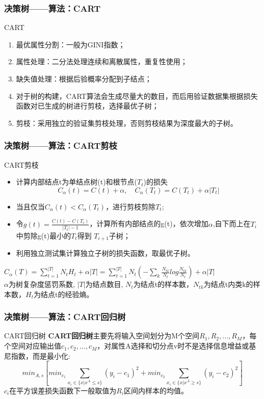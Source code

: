 \documentclass[usenames,dvipsnames]{beamer}
\begin{document}
\begin{frame}
\frametitle{决策树——算法：CART}
\begin{block}{CART}
  \begin{enumerate}
    \item 最优属性分割：一般为GINI指数；
    \item 属性处理：二分法处理连续和离散属性，重复性使用；
    \item 缺失值处理：根据后验概率分配到子结点；
    \item 对于树的构建，CART算法会生成尽量大的数目，而后用验证数据集根据损失函数对已生成的树进行剪枝，选择最优子树；
    \item 剪枝：采用独立的验证集剪枝处理，否则剪枝结果为深度最大的子树。
  \end{enumerate}
\end{block}
\end{frame}
\begin{frame}
\frametitle{决策树——算法：CART剪枝}
\begin{block}{CART剪枝}
  \begin{itemize}
    \item 计算内部结点t为单结点树(t)和根节点($T_t$)的损失
      $$C_\alpha(t) = C(t)+\alpha,\quad C_\alpha(T_t) = C(T_t)+\alpha|T_t|$$
    \item 当且仅当$C_\alpha(t)<C_\alpha(T_t)$，进行剪枝剪除$T_t$;
    \item 令$g(t) = \frac{C(t)-C(T_t)}{|T_t|-1}$，计算所有内部结点的g(t)，依次增加$\alpha$,自下而上在$T_i$中剪除g(t)最小的$T_{t}$得到
    $T_{i+1}$子树；
    \item 利用独立测试集计算独立子树的损失函数，取最优子树。
    \end{itemize}
\end{block}
$C_{\alpha}(T)=\sum_{t=1}^{|T|}N_tH_t + \alpha|T|= \sum_{t=1}^{|T|}N_t(-\sum_k\frac{N_{tk}}{N_t}log\frac{N_{tk}}{N_t})+ \alpha|T|$\\
$\alpha$为树复杂度惩罚系数, $|T|$为结点数目, $N_t$为结点t的样本数，$N_{tk}$为结点t内类k的样本数，$H_t$为结点t的经验熵。
\end{frame}
\begin{frame}
\frametitle{决策树——算法：CART回归树}
\begin{block}{CART回归树}
  \textbf{CART回归树}主要先将输入空间划分为M个空间$R_1,R_2,\dots,R_M$，每个空间对应输出值$c_1,c_2,\dots,c_M$，对属性A选择和切分点v时不是选择信息增益或基尼指数，而是最小化:
  $$min_{A,s}[min_{c_1}\sum_{x_i\in \{x|x^A\leq s\}}(y_i-c_1)^2+min_{c_2}\sum_{x_i\in \{x|x^A\geq s\}}(y_i-c_2)^2]$$
  $c_i$在平方误差损失函数下一般取值为$R_i$区间内样本的均值。
\end{block}
\end{frame}
\end{document}
